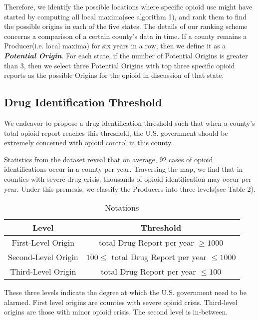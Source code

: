 Therefore, we identify the possible locations where specific opioid use might have started by computing all local maxima(see algorithm 1), and rank them to find the possible origins in each of the five states. The details of our ranking scheme concerns a comparison of a certain county's data in time. If a county remains a Producer(i.e. local maxima) for six years in a row, then we define it as a \textbf{\itshape Potential Origin}. For each state, if the number of Potential Origins is greater than 3, then we select three Potential Origins with top three specific opioid reports as the possible Origins for the opioid in discussion of that state.



\subsection{Drug Identification Threshold}
We endeavor to propose a drug identification threshold such that when a county's total opioid report reaches this threshold, the U.S. government should be extremely concerned with opioid control in this county.

Statistics from the dataset reveal that on average, 92 cases of opioid identifications occur in a county per year. Traversing the map, we find that in counties with severe drug crisis, thousands of opioid identification may occur per year. Under this premesis, we classify the Producers into three levels(see Table 2).

\begin{table}[H]
	\centering
	\begin{tabular}{|c|c|}
		\hline
		\rowcolor[HTML]{656565} 
		{\color[HTML]{FFFFFF} \textbf{Level}} & {\color[HTML]{FFFFFF} \textbf{Threshold}} \\ \hline
		First-Level Origin  & total Drug Report per year $\geq 1000$ \\ \hline
		Second-Level Origin & $100 \leq$ total Drug Report per year $\leq 1000$ \\ \hline
		Third-Level Origin  & total Drug Report per year $\leq 100$ \\ \hline
	\end{tabular}
	\caption{Notations}
\end{table}

These three levels indicate the degree at which the U.S. government need to be alarmed. First level origins are counties with severe opioid crisis. Third-level origins are those with minor opioid crisis. The second level is in-between.

